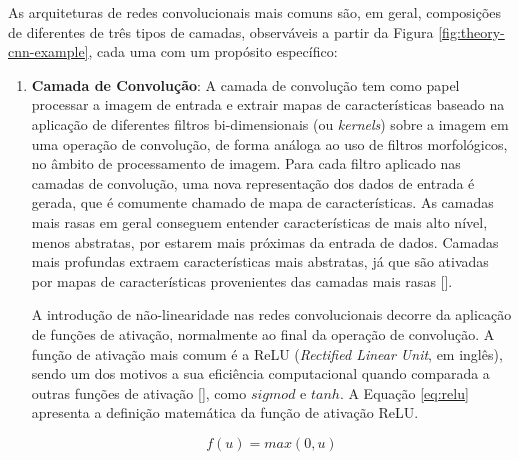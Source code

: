 As arquiteturas de redes convolucionais mais comuns são, em geral, composições de diferentes de três tipos de camadas, observáveis a partir da Figura \ref{fig:theory-cnn-example}, cada uma com um propósito específico:
\begin{enumerate}
    \item \textbf{Camada de Convolução}:
            A camada de convolução tem como papel processar a imagem de entrada e extrair mapas de características baseado na aplicação de diferentes filtros bi-dimensionais (ou \textit{kernels}) sobre a imagem em uma operação de convolução, de forma análoga ao uso de filtros morfológicos, no âmbito de processamento de imagem. Para cada filtro aplicado nas camadas de convolução, uma nova representação dos dados de entrada é gerada, que é comumente chamado de mapa de características. As camadas mais rasas em geral conseguem entender características de mais alto nível, menos abstratas, por estarem mais próximas da entrada de dados. Camadas mais profundas extraem características mais abstratas, já que são ativadas por mapas de características provenientes das camadas mais rasas [].
        
            A introdução de não-linearidade nas redes convolucionais decorre da aplicação de funções de ativação, normalmente ao final da operação de convolução. A função de ativação mais comum é a ReLU (\textit{Rectified Linear Unit}, em inglês), sendo um dos motivos a sua eficiência computacional quando comparada a outras funções de ativação [], como $sigmod$ e $tanh$. A Equação \ref{eq:relu} apresenta a definição matemática da função de ativação ReLU.
            
            \begin{equation}
                f(u) = max(0,u)
                \label{eq:relu}
            \end{equation}
            

\end{enumerate}
